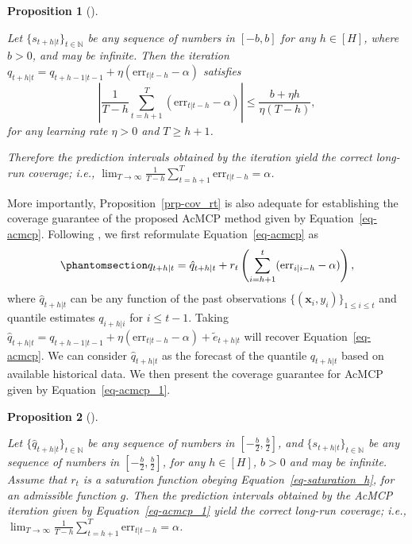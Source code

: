 \documentclass[
  11pt,
  a4paper,
]{article}
\theoremstyle{plain}
\newtheorem{proposition}{Proposition}[section]
\theoremstyle{remark}
\begin{document}
\begin{proposition}[]\protect\hypertarget{prp-cov_qt}{}\label{prp-cov_qt}

Let \(\{s_{t+h|t}\}_{t\in\mathbb{N}}\) be any sequence of numbers in
\([-b, b]\) for any \(h\in[H]\), where \(b>0\), and may be infinite.
Then the iteration
\(q_{t+h|t}=q_{t+h-1|t-1}+\eta (\mathrm{err}_{t|t-h}-\alpha)\) satisfies
\[
\left|\frac{1}{T-h}\sum_{t=h+1}^{T}(\mathrm{err}_{t|t-h}-\alpha)\right| \leq \frac{b + \eta h}{\eta(T-h)},
\] for any learning rate \(\eta > 0\) and \(T \geq h+1\).

Therefore the prediction intervals obtained by the iteration yield the
correct long-run coverage; i.e.,
\(\lim _{T \rightarrow \infty} \frac{1}{T-h} \sum_{t=h+1}^T \mathrm{err}_{t|t-h} = \alpha\).

\end{proposition}

More importantly, Proposition~\ref{prp-cov_rt} is also adequate for
establishing the coverage guarantee of the proposed AcMCP method given
by Equation~\ref{eq-acmcp}. Following \textcite{angelopoulos2024}, we
first reformulate Equation~\ref{eq-acmcp} as
\begin{equation}\phantomsection\label{eq-acmcp_1}{
q_{t+h|t}=\hat{q}_{t+h|t}+r_t\left(\sum_{i=h+1}^t (\mathrm{err}_{i|i-h}-\alpha)\right),
}\end{equation} where \(\hat{q}_{t+h|t}\) can be any function of the
past observations \(\{(\bm{x}_i, y_i)\}_{1 \leq i \leq t}\) and quantile
estimates \(q_{i+h|i}\) for \(i \leq t-1\). Taking
\(\hat{q}_{t+h|t}=q_{t+h-1|t-1}+\eta (\mathrm{err}_{t|t-h}-\alpha)+\tilde{e}_{t+h|t}\)
will recover Equation~\ref{eq-acmcp}. We can consider
\(\hat{q}_{t+h|t}\) as the forecast of the quantile \(q_{t+h|t}\) based
on available historical data. We then present the coverage guarantee for
AcMCP given by Equation~\ref{eq-acmcp_1}.

\begin{proposition}[]\protect\hypertarget{prp-cov_acmcp}{}\label{prp-cov_acmcp}

Let \(\{\hat{q}_{t+h|t}\}_{t\in\mathbb{N}}\) be any sequence of numbers
in \([-\frac{b}{2}, \frac{b}{2}]\), and
\(\{s_{t+h|t}\}_{t\in\mathbb{N}}\) be any sequence of numbers in
\([-\frac{b}{2},\frac{b}{2}]\), for any \(h\in[H]\), \(b>0\) and may be
infinite. Assume that \(r_t\) is a saturation function obeying
Equation~\ref{eq-saturation_h}, for an admissible function \(g\). Then
the prediction intervals obtained by the AcMCP iteration given by
Equation~\ref{eq-acmcp_1} yield the correct long-run coverage; i.e.,
\(\lim _{T \rightarrow \infty} \frac{1}{T-h} \sum_{t=h+1}^T \mathrm{err}_{t|t-h} = \alpha\).

\end{proposition}
\end{document}
